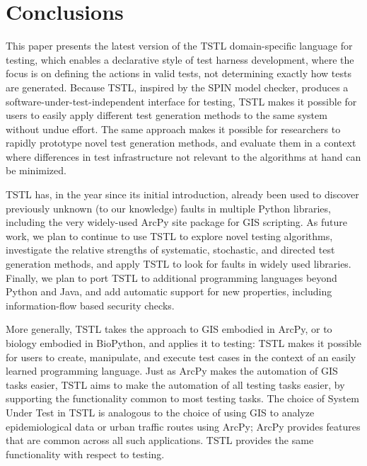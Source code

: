 \section{Conclusions}
\label{sec:conclusion}

This paper presents the latest version of the TSTL
\cite{NFM15,ISSTA15,tstl} domain-specific language for testing, which
enables a declarative style of test harness development, where the
focus is on defining the actions in valid tests, not determining
exactly how tests are generated.  Because TSTL, inspired by the SPIN
model checker, produces a software-under-test-independent interface
for testing, TSTL makes it possible for users to easily apply
different test generation methods to the same system without undue
effort.  The same approach makes it possible for researchers to rapidly prototype novel test generation
methods, and evaluate them in a context where differences in test
infrastructure not relevant to the algorithms at hand can be minimized.

TSTL has, in the year since its initial introduction,
already been used to discover previously unknown (to our knowledge)
faults in multiple Python libraries, including the very widely-used
ArcPy site package for GIS scripting. 
As future work, we plan to continue to use TSTL to explore novel
testing algorithms, investigate the relative strengths of systematic,
stochastic, and directed test generation methods, and apply TSTL to
look for faults in widely used libraries.  Finally, we plan to
port TSTL to additional
programming languages beyond Python and Java, and add automatic
support for new properties, including
information-flow based security checks.

More generally, TSTL takes the approach to GIS embodied in ArcPy, or
to biology embodied in BioPython, and applies it to testing:  TSTL
makes it possible for users to create, manipulate, and execute test
cases in the context of an easily learned programming language.  Just
as ArcPy makes the automation of GIS tasks easier, TSTL aims to make
the automation of all testing tasks easier, by supporting the
functionality common to most testing tasks.  The choice of System
Under Test in TSTL is analogous to the choice of using GIS to analyze
epidemiological data or urban traffic routes using ArcPy; ArcPy
provides features that are common across all such applications.  TSTL
provides the same functionality with respect to testing.